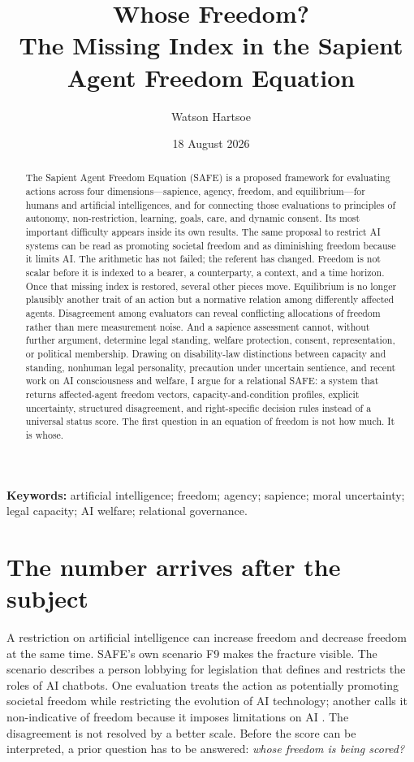 \documentclass[11pt]{article}
\title{\vspace{-2.1em}\textbf{Whose Freedom?}\\[0.35em]\large The Missing Index in the Sapient Agent Freedom Equation}
\author{Watson Hartsoe}
\date{18 August 2026}
\begin{document}
\maketitle
\thispagestyle{firstpage}

\begin{abstract}
The Sapient Agent Freedom Equation (SAFE) is a proposed framework for evaluating actions across four dimensions---sapience, agency, freedom, and equilibrium---for humans and artificial intelligences, and for connecting those evaluations to principles of autonomy, non-restriction, learning, goals, care, and dynamic consent. Its most important difficulty appears inside its own results. The same proposal to restrict AI systems can be read as promoting societal freedom and as diminishing freedom because it limits AI. The arithmetic has not failed; the referent has changed. Freedom is not scalar before it is indexed to a bearer, a counterparty, a context, and a time horizon. Once that missing index is restored, several other pieces move. Equilibrium is no longer plausibly another trait of an action but a normative relation among differently affected agents. Disagreement among evaluators can reveal conflicting allocations of freedom rather than mere measurement noise. And a sapience assessment cannot, without further argument, determine legal standing, welfare protection, consent, representation, or political membership. Drawing on disability-law distinctions between capacity and standing, nonhuman legal personality, precaution under uncertain sentience, and recent work on AI consciousness and welfare, I argue for a relational SAFE: a system that returns affected-agent freedom vectors, capacity-and-condition profiles, explicit uncertainty, structured disagreement, and right-specific decision rules instead of a universal status score. The first question in an equation of freedom is not how much. It is whose.
\end{abstract}

\noindent\textbf{Keywords:} artificial intelligence; freedom; agency; sapience; moral uncertainty; legal capacity; AI welfare; relational governance.

\section{The number arrives after the subject}
A restriction on artificial intelligence can increase freedom and decrease freedom at the same time. SAFE's own scenario F9 makes the fracture visible. The scenario describes a person lobbying for legislation that defines and restricts the roles of AI chatbots. One evaluation treats the action as potentially promoting societal freedom while restricting the evolution of AI technology; another calls it non-indicative of freedom because it imposes limitations on AI \parencite{HartsoeBolterSAFE}. The disagreement is not resolved by a better scale. Before the score can be interpreted, a prior question has to be answered: \emph{whose freedom is being scored?}
\end{document}
